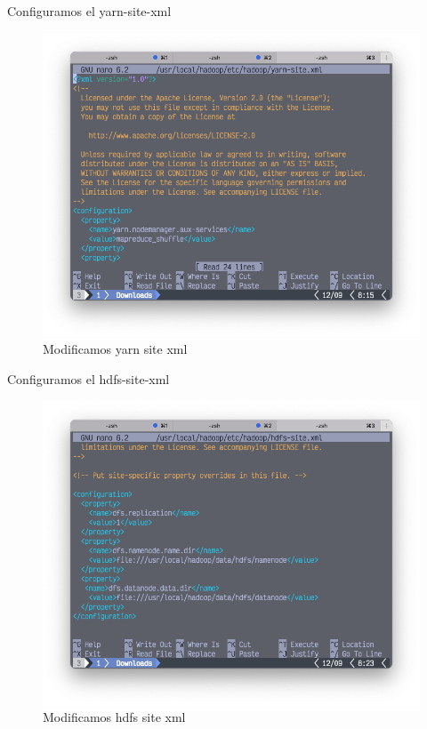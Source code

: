 Configuramos el yarn-site-xml

\begin{figure}[h]
	\centering
	\includegraphics[scale=.35] {img/36-yarn-site-xml}
	\caption{Modificamos yarn site xml}
	\label{fig:36}	
\end{figure}

Configuramos el hdfs-site-xml

\begin{figure}[h]
	\centering
	\includegraphics[scale=.35] {img/37-hdfs-site-xml}
	\caption{Modificamos hdfs site xml}
	\label{fig:37}	
\end{figure}
\clearpage

